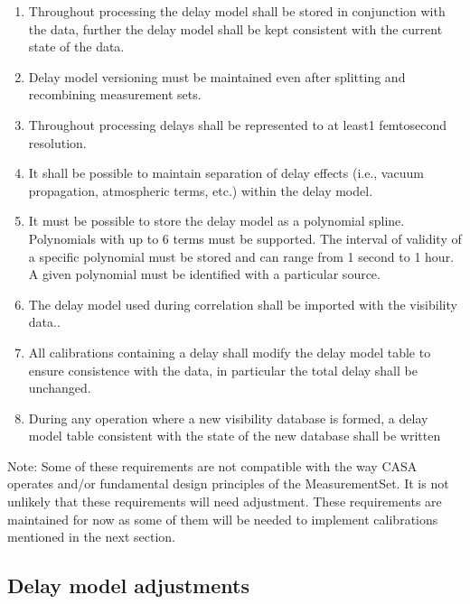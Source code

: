 \documentclass[11pt,a4paper]{article}
\begin{document}
\begin{enumerate}[subseclist]

  \item Throughout processing the delay model shall be stored in
    conjunction with the data, further the delay model shall be kept
    consistent with the current state of the data.

  \item Delay model versioning must be maintained even after splitting
    and recombining measurement sets.

  \item Throughout processing delays shall be represented to at least1
    femtosecond resolution.

  \item It shall be possible to maintain separation of delay effects
    (i.e., vacuum propagation, atmospheric terms, etc.) within the
    delay model.

  \item It must be possible to store the delay model as a polynomial
    spline. Polynomials with up to 6 terms must be supported. The
    interval of validity of a specific polynomial must be stored and
    can range from 1 second to 1 hour. A given polynomial must be
    identified with a particular source.

  \item The delay model used during correlation shall be imported with
    the visibility data..

  \item All calibrations containing a delay shall modify the delay
    model table to ensure consistence with the data, in particular the
    total delay shall be unchanged.

  \item During any operation where a new visibility database is
    formed, a delay model table consistent with the state of the new
    database shall be written

\end{enumerate}

Note: Some of these requirements are not compatible with the way CASA
operates and/or fundamental design principles of the MeasurementSet.
It is not unlikely that these requirements will need adjustment.
These requirements are maintained for now as some of them will be
needed to implement calibrations mentioned in the next section.

\subsection{Delay model adjustments}
\end{document}
